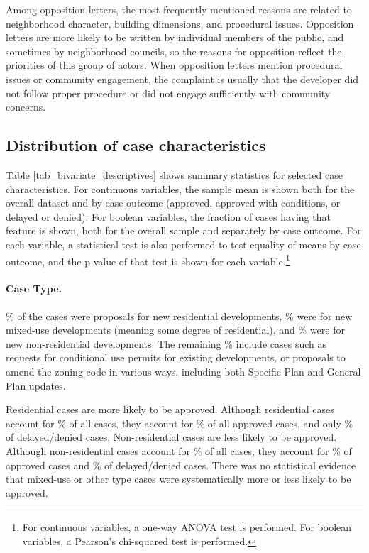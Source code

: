 Among opposition letters, the most frequently mentioned reasons are related to neighborhood character, building dimensions, and procedural issues.  Opposition letters are more likely to be written by individual members of the public, and sometimes by neighborhood councils, so the reasons for opposition reflect the priorities of this group of actors.  When opposition letters mention procedural issues or community engagement, the complaint is usually that the developer did not follow proper procedure or did not engage sufficiently with community concerns.

\subsection{Distribution of case characteristics}

Table \ref{tab_bivariate_descriptives} shows summary statistics for selected case characteristics. For continuous variables, the sample mean is shown both for the overall dataset and by case outcome (approved, approved with conditions, or delayed or denied). For boolean variables, the fraction of cases having that feature is shown, both for the overall sample and separately by case outcome. For each variable, a statistical test is also performed to test equality of means by case outcome, and the p-value of that test is shown for each variable.\footnote{For continuous variables, a one-way ANOVA test is performed. For boolean variables, a Pearson's chi-squared test is performed.}

\paragraph{Case Type.} \% of the cases were proposals for new residential developments, \% were for new mixed-use developments (meaning some degree of residential), and \% were for new non-residential developments. The remaining \% include cases such as requests for conditional use permits for existing developments, or proposals to amend the zoning code in various ways, including both Specific Plan and General Plan updates.

Residential cases are more likely to be approved. Although residential cases account for \% of all cases, they account for \% of all approved cases, and only \% of delayed/denied cases. Non-residential cases are less likely to be approved. Although non-residential cases account for \% of all cases, they account for \% of approved cases and \% of delayed/denied cases. There was no statistical evidence that mixed-use or other type cases were systematically more or less likely to be approved.

